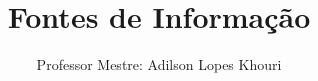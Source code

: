 \documentclass[compress, hyperref={pdfpagelayout=SinglePage}]{beamer}
\title[TCC II - Aula 03]{Fontes de Informação}
\author{Professor Mestre: Adilson Lopes Khouri}
\begin{document}
	
	\begin{frame}
		\titlepage
	\end{frame}
	
	
	
	
	
	
	
	
	
	
	
\end{document}
